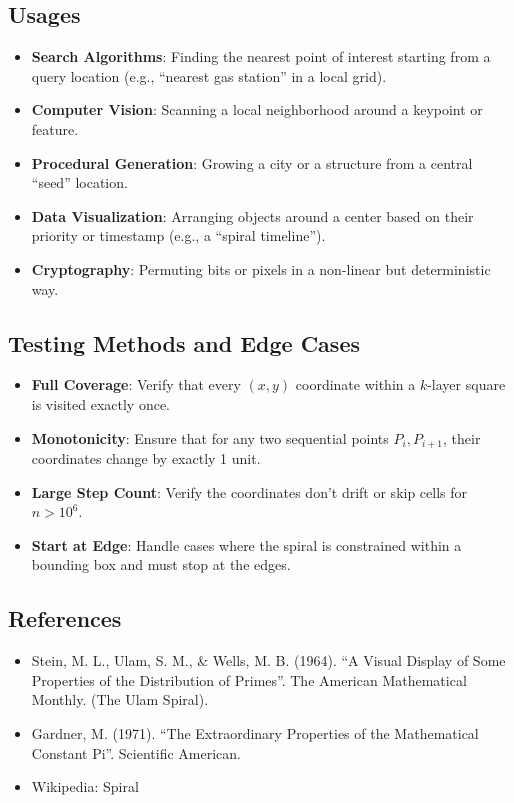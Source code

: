 \subsection{Usages}
\begin{itemize}
    \item \textbf{Search Algorithms}: Finding the nearest point of interest starting from a query location (e.g., ``nearest gas station'' in a local grid).
    \item \textbf{Computer Vision}: Scanning a local neighborhood around a keypoint or feature.
    \item \textbf{Procedural Generation}: Growing a city or a structure from a central ``seed'' location.
    \item \textbf{Data Visualization}: Arranging objects around a center based on their priority or timestamp (e.g., a ``spiral timeline'').
    \item \textbf{Cryptography}: Permuting bits or pixels in a non-linear but deterministic way.
\end{itemize}

\subsection{Testing Methods and Edge Cases}
\begin{itemize}
    \item \textbf{Full Coverage}: Verify that every $(x, y)$ coordinate within a $k$-layer square is visited exactly once.
    \item \textbf{Monotonicity}: Ensure that for any two sequential points $P_i, P_{i+1}$, their coordinates change by exactly 1 unit.
    \item \textbf{Large Step Count}: Verify the coordinates don't drift or skip cells for $n > 10^6$.
    \item \textbf{Start at Edge}: Handle cases where the spiral is constrained within a bounding box and must stop at the edges.
\end{itemize}

\subsection{References}
\begin{itemize}
    \item Stein, M. L., Ulam, S. M., \& Wells, M. B. (1964). ``A Visual Display of Some Properties of the Distribution of Primes''. The American Mathematical Monthly. (The Ulam Spiral).
    \item Gardner, M. (1971). ``The Extraordinary Properties of the Mathematical Constant Pi''. Scientific American.
    \item Wikipedia: Spiral
\end{itemize}

